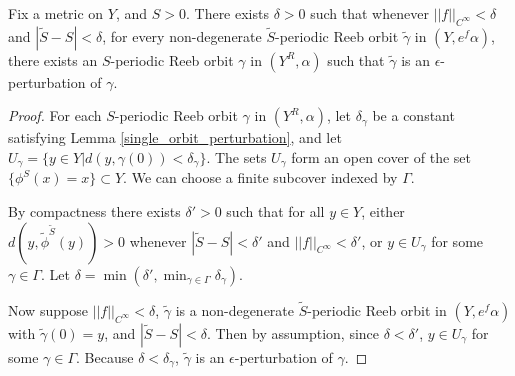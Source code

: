 \documentclass{article}
\numberwithin{equation}{section}
\numberwithin{figure}{section}
\begin{document}
\begin{lem}
\label{fixed_period_perturbation}
Fix a metric on $Y$, and $S>0$. There exists $\delta>0$ such that whenever $||f||_{C^\infty}<\delta$ and $|\tilde{S}-S|<\delta$, for every non-degenerate $\tilde{S}$-periodic Reeb orbit $\tilde{\gamma}$ in $(Y,e^f\alpha)$, there exists an $S$-periodic Reeb orbit $\gamma$ in $(Y^R,\alpha)$ such that $\tilde{\gamma}$ is an $\epsilon$-perturbation of $\gamma$.
\end{lem}
\begin{proof}
    For each $S$-periodic Reeb orbit $\gamma$ in $(Y^R,\alpha)$, let $\delta_\gamma$ be a constant satisfying Lemma \ref{single_orbit_perturbation}, and let $U_\gamma=\{y\in Y| d(y,\gamma(0))<\delta_\gamma\}$. The sets $U_\gamma$ form an open cover of the set $\{\phi^S(x)=x\}\subset Y$. We can choose a finite subcover indexed by $\Gamma$.

    By compactness there exists $\delta'>0$ such that for all $y\in Y$, either $d(y,\tilde{\phi}^{\tilde{S}}(y))>0$ whenever $|\tilde{S}-S|<\delta'$ and $||f||_{C^\infty}<\delta'$, or $y\in U_\gamma$ for some $\gamma\in\Gamma$. Let $\delta=\min(\delta',\min_{\gamma\in\Gamma}\delta_\gamma)$.

    Now suppose $||f||_{C^\infty}<\delta$, $\tilde{\gamma}$ is a non-degenerate $\tilde{S}$-periodic Reeb orbit in $(Y,e^f\alpha)$ with $\tilde{\gamma}(0)=y$, and $|\tilde{S}-S|<\delta$. Then by assumption, since $\delta<\delta'$, $y\in U_\gamma$ for some $\gamma\in\Gamma$. Because $\delta<\delta_\gamma$, $\tilde{\gamma}$ is an $\epsilon$-perturbation of $\gamma$.
\end{proof}
\end{document}
